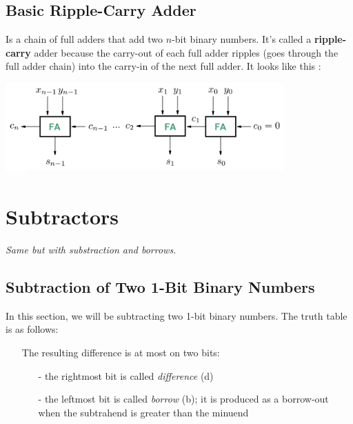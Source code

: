 \documentclass[12pt,openany]{book}
\begin{document}
			      	\subsection{Basic Ripple-Carry Adder}
			      	Is a chain of full adders that add two \( n \)-bit binary numbers. It's called a \textbf{ripple-carry} adder because the carry-out of each full adder ripples (goes through the full adder chain) into the carry-in of the next full adder. It looks like this :
			      	
			      	\vspace{10px}
			      	
			 
			      	\begin{center}
			      		\begin{minipage}[c]{0.80\textwidth} %
			      			\centering
			      			\includegraphics[width=0.80\textwidth]{circuits/8.1.7.png} %
			      		\end{minipage}
			      		  
			      	\end{center}
			      	
			      	
			      	\section{Subtractors}
			      	\textit{Same but with substraction and borrows.}
			      	\subsection{Subtraction of Two 1-Bit Binary Numbers}
			      	In this section, we will be subtracting two 1-bit binary numbers. The truth table is as follows:
			      	\begin{itemize}
			      		\item[] The resulting difference is at most on two bits:
			      		      \begin{itemize}
			      		      	\item[-] the rightmost bit is called \textit{difference} (d)
			      		      	\item[-] the leftmost bit is called \textit{borrow} (b); it is produced as a borrow-out when the subtrahend is greater than the minuend
			      		      \end{itemize}
			      	\end{itemize}
			      	
\end{document}
